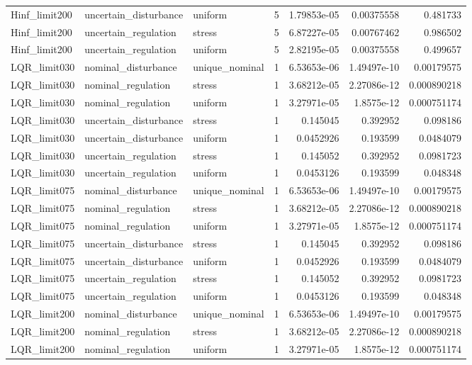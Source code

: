 \begin{tabular}{llllrrr}
Hinf\_limit200 & uncertain\_disturbance & uniform & 5 & 1.79853e-05 & 0.00375558 & 0.481733 \\
Hinf\_limit200 & uncertain\_regulation & stress & 5 & 6.87227e-05 & 0.00767462 & 0.986502 \\
Hinf\_limit200 & uncertain\_regulation & uniform & 5 & 2.82195e-05 & 0.00375558 & 0.499657 \\
LQR\_limit030 & nominal\_disturbance & unique\_nominal & 1 & 6.53653e-06 & 1.49497e-10 & 0.00179575 \\
LQR\_limit030 & nominal\_regulation & stress & 1 & 3.68212e-05 & 2.27086e-12 & 0.000890218 \\
LQR\_limit030 & nominal\_regulation & uniform & 1 & 3.27971e-05 & 1.8575e-12 & 0.000751174 \\
LQR\_limit030 & uncertain\_disturbance & stress & 1 & 0.145045 & 0.392952 & 0.098186 \\
LQR\_limit030 & uncertain\_disturbance & uniform & 1 & 0.0452926 & 0.193599 & 0.0484079 \\
LQR\_limit030 & uncertain\_regulation & stress & 1 & 0.145052 & 0.392952 & 0.0981723 \\
LQR\_limit030 & uncertain\_regulation & uniform & 1 & 0.0453126 & 0.193599 & 0.048348 \\
LQR\_limit075 & nominal\_disturbance & unique\_nominal & 1 & 6.53653e-06 & 1.49497e-10 & 0.00179575 \\
LQR\_limit075 & nominal\_regulation & stress & 1 & 3.68212e-05 & 2.27086e-12 & 0.000890218 \\
LQR\_limit075 & nominal\_regulation & uniform & 1 & 3.27971e-05 & 1.8575e-12 & 0.000751174 \\
LQR\_limit075 & uncertain\_disturbance & stress & 1 & 0.145045 & 0.392952 & 0.098186 \\
LQR\_limit075 & uncertain\_disturbance & uniform & 1 & 0.0452926 & 0.193599 & 0.0484079 \\
LQR\_limit075 & uncertain\_regulation & stress & 1 & 0.145052 & 0.392952 & 0.0981723 \\
LQR\_limit075 & uncertain\_regulation & uniform & 1 & 0.0453126 & 0.193599 & 0.048348 \\
LQR\_limit200 & nominal\_disturbance & unique\_nominal & 1 & 6.53653e-06 & 1.49497e-10 & 0.00179575 \\
LQR\_limit200 & nominal\_regulation & stress & 1 & 3.68212e-05 & 2.27086e-12 & 0.000890218 \\
LQR\_limit200 & nominal\_regulation & uniform & 1 & 3.27971e-05 & 1.8575e-12 & 0.000751174 \\

\end{tabular}
